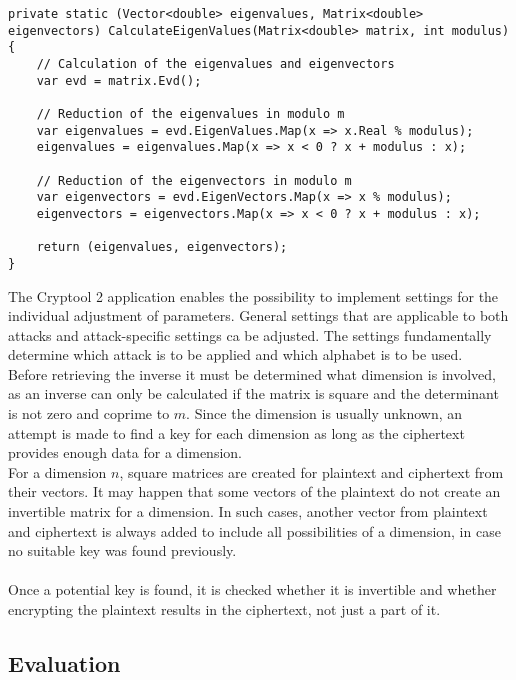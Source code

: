 \documentclass[conference]{IEEEtran}
\begin{document}
\begin{lstlisting}[caption={CalculateEigenValues method}, label={lst:calcEigenVal}]
private static (Vector<double> eigenvalues, Matrix<double> eigenvectors) CalculateEigenValues(Matrix<double> matrix, int modulus)
{
    // Calculation of the eigenvalues and eigenvectors
    var evd = matrix.Evd();

    // Reduction of the eigenvalues in modulo m
    var eigenvalues = evd.EigenValues.Map(x => x.Real % modulus);
    eigenvalues = eigenvalues.Map(x => x < 0 ? x + modulus : x);

    // Reduction of the eigenvectors in modulo m
    var eigenvectors = evd.EigenVectors.Map(x => x % modulus);
    eigenvectors = eigenvectors.Map(x => x < 0 ? x + modulus : x);

    return (eigenvalues, eigenvectors);
}
\end{lstlisting}

The Cryptool 2 application enables the possibility to implement settings for the individual adjustment of parameters. General settings that are applicable to both attacks and attack-specific settings ca be adjusted. The settings fundamentally determine which attack is to be applied and which alphabet is to be used.
\\
Before retrieving the inverse it must be determined what dimension is involved, as an inverse can only be calculated if the matrix is square and the determinant is not zero and coprime to \(m\). Since the dimension is usually unknown, an attempt is made to find a key for each dimension as long as the ciphertext provides enough data for a dimension.
\\
For a dimension \(n\), square matrices are created for plaintext and ciphertext from their vectors. It may happen that some vectors of the plaintext do not create an invertible matrix for a dimension. In such cases, another vector from plaintext and ciphertext is always added to include all possibilities of a dimension, in case no suitable key was found previously.
\\\\
Once a potential key is found, it is checked whether it is invertible and whether encrypting the plaintext results in the ciphertext, not just a part of it.\\



\subsection{Evaluation}
\end{document}
